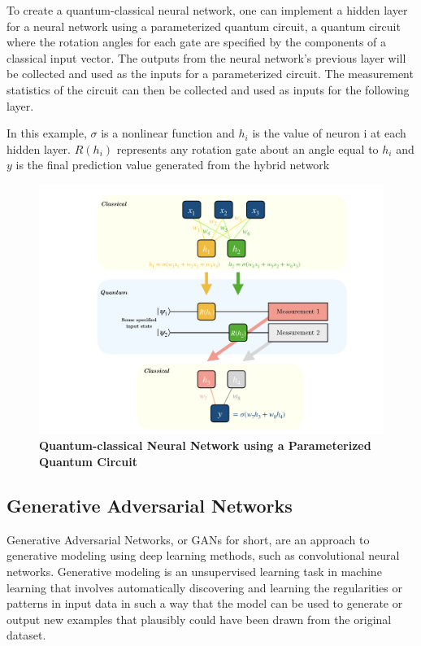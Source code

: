 \documentclass{scrartcl}
\begin{document}
To create a quantum-classical neural network, one can implement a hidden layer for a neural network using a parameterized quantum circuit, a quantum circuit where the rotation angles for each gate are specified by the components of a classical input vector. The outputs from the neural network's previous layer will be collected and used as the inputs for a parameterized circuit. The measurement statistics of the circuit can then be collected and used as inputs for the following layer.

In this example, \(\sigma\) is a nonlinear function and \(h_{i}\) is the value of neuron i at each hidden layer. \(R(h_{i})\) represents any rotation gate about an angle equal to \(h_{i}\) and \(y\) is the final prediction value generated from the hybrid network

\begin{figure}[htbp]
\centering
\includegraphics[width=.9\linewidth]{./assets/neuralnetworkQC.png}
\caption{\textbf{Quantum-classical Neural Network using a Parameterized Quantum Circuit}}
\end{figure}

\subsection{Generative Adversarial Networks}
\label{sec:orgc118b07}

Generative Adversarial Networks, or GANs for short, are an approach to generative modeling using deep learning methods, such as convolutional neural networks. Generative modeling is an unsupervised learning task in machine learning that involves automatically discovering and learning the regularities or patterns in input data in such a way that the model can be used to generate or output new examples that plausibly could have been drawn from the original dataset.
\end{document}
